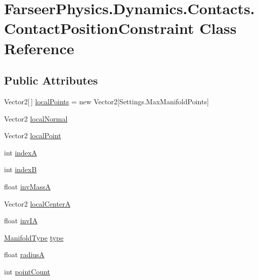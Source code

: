 \hypertarget{class_farseer_physics_1_1_dynamics_1_1_contacts_1_1_contact_position_constraint}{\section{Farseer\+Physics.\+Dynamics.\+Contacts.\+Contact\+Position\+Constraint Class Reference}
\label{class_farseer_physics_1_1_dynamics_1_1_contacts_1_1_contact_position_constraint}
}
\subsection*{Public Attributes}
\begin{DoxyCompactItemize}
\item 
Vector2\mbox{[}$\,$\mbox{]} \hyperlink{class_farseer_physics_1_1_dynamics_1_1_contacts_1_1_contact_position_constraint_ab31ada520a4c67dd14c5bcd6a7e58b4a}{local\+Points} = new Vector2\mbox{[}Settings.\+Max\+Manifold\+Points\mbox{]}
\item 
Vector2 \hyperlink{class_farseer_physics_1_1_dynamics_1_1_contacts_1_1_contact_position_constraint_aea0ef02ebf2c16bb306e7ba8ca95290b}{local\+Normal}
\item 
Vector2 \hyperlink{class_farseer_physics_1_1_dynamics_1_1_contacts_1_1_contact_position_constraint_aea367e65a3051870d75ff77f3f6e91df}{local\+Point}
\item 
int \hyperlink{class_farseer_physics_1_1_dynamics_1_1_contacts_1_1_contact_position_constraint_a5fe00c71d13db5d456b646ea159b5e2d}{index\+A}
\item 
int \hyperlink{class_farseer_physics_1_1_dynamics_1_1_contacts_1_1_contact_position_constraint_ad8973bd12311f7de2e0e8ee5fd486191}{index\+B}
\item 
float \hyperlink{class_farseer_physics_1_1_dynamics_1_1_contacts_1_1_contact_position_constraint_a2ebcfb5df201d38136fc39d3a2b12cbc}{inv\+Mass\+A}
\item 
Vector2 \hyperlink{class_farseer_physics_1_1_dynamics_1_1_contacts_1_1_contact_position_constraint_aa0257719a06af8008b9754c0760de574}{local\+Center\+A}
\item 
float \hyperlink{class_farseer_physics_1_1_dynamics_1_1_contacts_1_1_contact_position_constraint_a26babbaaff9157575e907442c56c2628}{inv\+I\+A}
\item 
\hyperlink{namespace_farseer_physics_1_1_collision_a7020490145ac65404675bdce1ebeafae}{Manifold\+Type} \hyperlink{class_farseer_physics_1_1_dynamics_1_1_contacts_1_1_contact_position_constraint_acdc882d378baf697b37ce879a125bb2d}{type}
\item 
float \hyperlink{class_farseer_physics_1_1_dynamics_1_1_contacts_1_1_contact_position_constraint_a6545a760e686bd16539a742b7e6ebcae}{radius\+A}
\item 
int \hyperlink{class_farseer_physics_1_1_dynamics_1_1_contacts_1_1_contact_position_constraint_a9db1b5d9ebb16d63f71aa0a8fd1eb00f}{point\+Count}
\end{DoxyCompactItemize}


